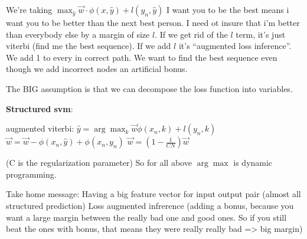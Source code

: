 We're taking $\max_{\hat y}\vec w \cdot \phi(x,\hat y) + l(y_n, \hat
y)$ I want you to be the best means i want you to be better than the
next best person. I need ot insure that i'm better than everybody else
by a margin of size $l$.
If we get rid of the $l$ term, it's just viterbi (find me the best
sequence). If we add $l$ it's ``augmented loss inference''. We add 1
to every in correct path. We want to find the best sequence even though we add incorrect nodes an
artificial bonus. 

The BIG assumption is that we can decompose the loss function into variables.

\textbf{Structured svm}:
\begin{algorithmic}
  \STATE augmented viterbi: $\hat y = \arg\max_k \vec w \dot \phi(x_n,
  k) + l(y_n,k)$
\STATE $\vec w = \vec w - \phi(x_n,\hat y) + \phi(x_n, y_n)$
\ENDIF
\STATE $\vec w = (1-\frac{1}{CN})\vec w$
\ENDFOR
\end{algorithmic}
(C is the regularization parameter) So for all above $\arg\max$ is
dynamic programming.

Take home message: Having a big feature vector for input output pair
(almost all structured prediction)
Loss augmented infrerence (adding a bonus, because you want a large
margin between the really bad one and good ones. So if you still beat
the ones with bonus, that means they were really really bad => big margin)

